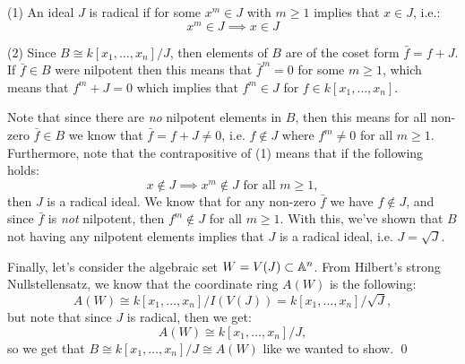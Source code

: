 (1) An ideal $J$ is radical if for some $x^m \in J$ with $m \geq 1$ implies that $x \in J$, i.e.:
$$ x^m \in J \implies x \in J  $$

(2) Since $B \cong k[x_1, \ldots, x_n]/J$, then elements of $B$ are of the coset form $\bar{f} = f + J$. If $\bar{f} \in B$ were nilpotent then this means that $\bar{f}^m = 0$ for some $m\geq 1$, which means that $f^m + J = 0$ which implies that $f^m \in J$ for $f\in k[x_1, \ldots, x_n]$.

Note that since there are \emph{no} nilpotent elements in $B$, then this means for all non-zero $\bar{f} \in B$ we know that $\bar{f} = f + J \neq 0$, i.e. $f \notin J$ where $f^m \neq 0$ for all $m\geq 1$. Furthermore, note that the contrapositive of (1) means that if the following holds:
$$ x \notin J \implies x^m \notin J \text{ for all } m\geq 1, $$
then $J$ is a radical ideal. We know that for any non-zero $\bar{f}$ we have $f \notin J$, and since $\bar{f}$ is \emph{not} nilpotent, then $f^m \notin J$ for all $m\geq 1$. With this, we've shown that $B$ not having any nilpotent elements implies that $J$ is a radical ideal, i.e. $J = \sqrt{J}$.

Finally, let's consider the algebraic set $W = V(J) \subset \mathbb{A}^n$. From Hilbert's strong Nullstellensatz, we know that the coordinate ring $A(W)$ is the following:
$$ A(W) \cong k[x_1, \ldots, x_n]/I(V(J)) = k[x_1, \ldots, x_n]/\sqrt{J}, $$
but note that since $J$ is radical, then we get:
$$ A(W) \cong k[x_1, \ldots, x_n]/J, $$
so we get that $B \cong k[x_1, \ldots, x_n]/J \cong A(W)$ like we wanted to show. \qed

